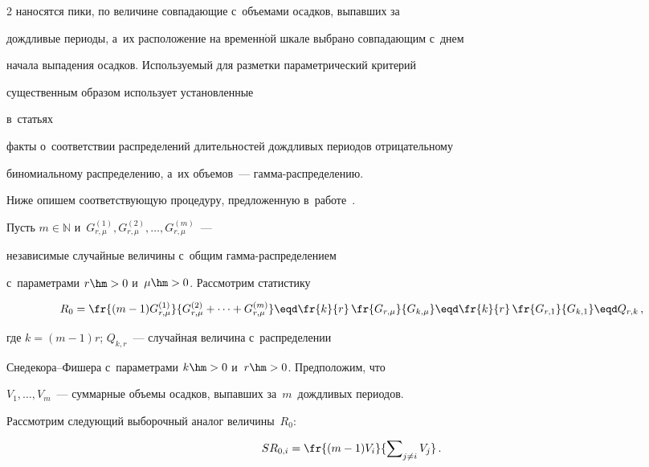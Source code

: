 \begin{multicols}{2}
наносятся пики, по величине совпадающие с~объемами осадков, выпавших за 


дождливые периоды, а~их расположение на временн$\acute{\mbox{о}}$й шкале выбрано совпадающим с~днем 


начала выпадения осадков. Используемый для разметки параметрический критерий 


существенным образом использует установленные 


в~статьях~\cite{Gorshenin2017a,Gorshenin2017b,Gorshenin2017c,Gorshenin2017d,Gorshenin2018bs,Gorshenin2018c} 


факты о~соответствии распределений длительностей дождливых периодов отрицательному 


биномиальному распределению, а~их объемов~--- гам\-ма-рас\-пре\-де\-ле\-нию. 


%


Ниже опишем соответствующую процедуру, предложенную в~работе~\cite{Gorshenin2018as}.





Пусть $m\in\mathbb{N}$ и~$G^{(1)}_{r,\mu},G^{(2)}_{r,\mu},\ldots,G^{(m)}_{r,\mu}$~--- 


независимые случайные величины с~общим гам\-ма-рас\-пре\-де\-ле\-ни\-ем 


с~параметрами $r\hm>0$ и~$\mu\hm>0$. Рассмотрим статистику


\begin{equation*}


R_0=\fr{(m-1)G^{(1)}_{r,\mu}}{G^{(2)}_{r,\mu}+


\cdots+G^{(m)}_{r,\mu}}\eqd


\fr{k}{r}\,\fr{G_{r,\mu}}{G_{k,\mu}}\eqd\fr{k}{r}\,\fr{G_{r,1}}{G_{k,1}}\eqd


Q_{r,k}\,,


\end{equation*}


где $k=(m-1)r$; $Q_{k,r}$~---  случайная величина с~распределении 


Сне\-де\-ко\-ра--Фи\-ше\-ра с~параметрами $k\hm>0$ и~$r\hm>0$. Предположим, что 


$V_1,\ldots,V_m$~--- суммарные объемы осадков, выпавших за~$m$~дождли\-вых периодов. 


Рассмотрим следующий выборочный аналог величины~$R_0$:


\begin{equation*}


SR_{0,i}=\fr{(m-1)V_i}{\sum\nolimits_{j\neq i}V_j}\,.



\end{equation*}
\end{multicols}
